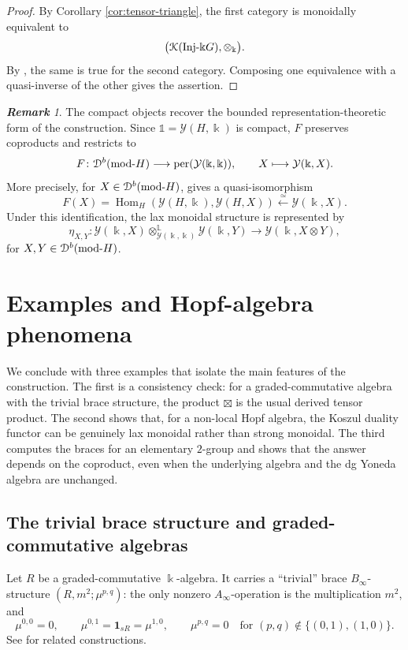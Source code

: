 \documentclass[a4paper, 11pt]{amsart}
\theoremstyle{definition}
\theoremstyle{remark}
\newtheorem{rem}[thm]{\bf Remark}
\numberwithin{equation}{section}
\newcommand{\Y}{\mathcal{Y}}
\newcommand{\id}{\mathbf{1}}
\newcommand{\ED}{\EuScript{D}}
\newcommand{\EK}{\EuScript{K}}
\begin{document}
\begin{proof}
By Corollary \ref{cor:tensor-triangle}, the first category is
monoidally equivalent to
\[
\bigl(\EK(\mathrm{Inj}\text{-}\Bbbk G),\otimes_\Bbbk\bigr).
\]
By \cite[Theorems 4.2 and 7.8]{BeKr}, the same is true for the second
category. Composing one equivalence with a quasi-inverse of the other
gives the assertion.
\end{proof}




\begin{rem}
The compact objects recover the bounded representation-theoretic form of the construction. Since $\mathbb 1=\Y(H,\Bbbk)$ is compact, $F$ preserves coproducts and restricts to
\[
F\colon\ED^b(\mathrm{mod}\text{-}H)
\longrightarrow
\operatorname{per}(\Y(\Bbbk,\Bbbk)),
\qquad
X\longmapsto\Y(\Bbbk,X).
\]
More precisely, for $X\in\ED^b(\mathrm{mod}\text{-}H)$, \cite[Proposition 3.11]{ChWa1} gives a quasi-isomorphism
\[
F(X)=\operatorname{Hom}_H(\Y(H,\Bbbk),\Y(H,X))
\xleftarrow{\simeq}
\Y(\Bbbk,X).
\]
Under this identification, the lax monoidal structure is represented by
\[
\eta_{X,Y}\colon
\Y(\Bbbk,X)\otimes^{\mathbb L}_{\Y(\Bbbk,\Bbbk)}\Y(\Bbbk,Y)
\longrightarrow
\Y(\Bbbk,X\otimes Y),
\]
for $X,Y\in\ED^b(\mathrm{mod}\text{-}H)$.
\end{rem}




\section{Examples and Hopf-algebra phenomena}\label{section:example}
We conclude with three examples that isolate the main features of the construction. The first is a consistency check: for a graded-commutative algebra with the trivial brace structure, the product $\boxtimes$ is the usual derived tensor product. The second shows that, for a non-local Hopf algebra, the Koszul duality functor can be genuinely lax monoidal rather than strong monoidal. The third computes the braces for an elementary $2$-group and shows that the answer depends on the coproduct, even when the underlying algebra and the dg Yoneda algebra are unchanged.

\subsection{The trivial brace structure and graded-commutative algebras}\label{subsection:commutative}
Let $R$ be a graded-commutative $\Bbbk$-algebra. It carries a ``trivial'' brace $B_\infty$-structure $(R,m^2;\mu^{p,q})$: the only nonzero $A_\infty$-operation is the multiplication $m^2$, and
\[
\mu^{0,0}=0,
\qquad
\mu^{0,1}=\id_{sR}=\mu^{1,0},
\qquad
\mu^{p,q}=0
\quad\text{for }(p,q)\notin\{(0,1),(1,0)\}.
\]
See \cite{LoRo} for related constructions.
\end{document}
